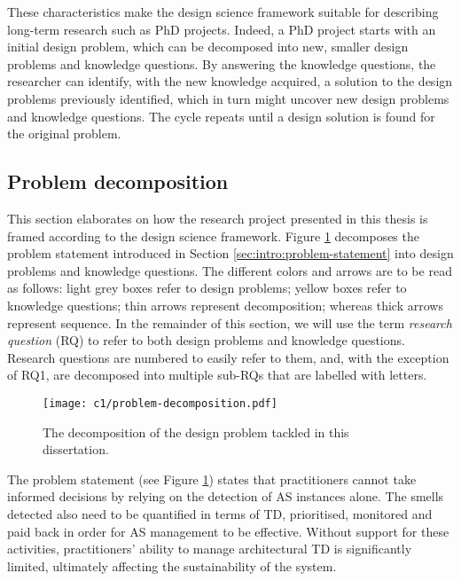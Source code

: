These characteristics make the design science framework suitable for describing long-term research such as PhD projects.
Indeed, a PhD project starts with an initial design problem, which can be decomposed into new, smaller design problems and knowledge questions.
By answering the knowledge questions, the researcher can identify, with the new knowledge acquired, a solution to the design problems previously identified, which in turn might uncover new design problems and knowledge questions.
The cycle repeats until a design solution is found for the original problem.

\subsection{Problem decomposition}
This section elaborates on how the research project presented in this thesis is framed according to the design science framework. 
Figure \ref{fig:intro:problem-decomposition} decomposes the problem statement introduced in Section \ref{sec:intro:problem-statement} into design problems and knowledge questions.
The different colors and arrows are to be read as follows: light grey boxes refer to design problems; yellow boxes refer to knowledge questions; thin arrows represent decomposition; whereas thick arrows represent sequence.
In the remainder of this section, we will use the term \emph{research question} (RQ) to refer to both design problems and knowledge questions.
Research questions are numbered to easily refer to them, and, with the exception of RQ1, are decomposed into multiple sub-RQs that are labelled with letters.

\begin{figure}
    \centering
    \texttt{[image: c1/problem-decomposition.pdf]}
    \caption{The decomposition of the design problem tackled in this dissertation.}\label{fig:intro:problem-decomposition}
\end{figure}

The problem statement (see Figure \ref{fig:intro:problem-decomposition}) states that practitioners cannot take informed decisions by relying on the detection of AS instances alone.
The smells detected also need to be quantified in terms of TD, prioritised, monitored and paid back in order for AS management to be effective.
Without support for these activities, practitioners' ability to manage architectural TD is significantly limited, ultimately affecting the sustainability of the system.

